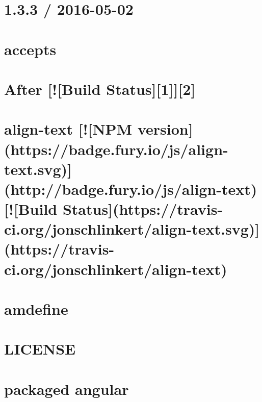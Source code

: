 \documentclass[twoside]{book}
\newcommand{\+}{\discretionary{\mbox{\scriptsize$\hookleftarrow$}}{}{}}
\begin{document}
\chapter{1.3.3 / 2016-\/05-\/02}
\label{md_app_web_node_modules_accepts__h_i_s_t_o_r_y}

\chapter{accepts}
\label{md_app_web_node_modules_accepts__r_e_a_d_m_e}

\chapter{After \mbox{[}!\mbox{[}Build Status\mbox{]}\mbox{[}1\mbox{]}\mbox{]}\mbox{[}2\mbox{]}}
\label{md_app_web_node_modules_after__r_e_a_d_m_e}

\chapter{align-\/text \mbox{[}!\mbox{[}N\+PM version\mbox{]}(https\+://badge.fury.\+io/js/align-\/text.svg)\mbox{]}(http\+://badge.fury.\+io/js/align-\/text) \mbox{[}!\mbox{[}Build Status\mbox{]}(https\+://travis-\/ci.org/jonschlinkert/align-\/text.svg)\mbox{]}(https\+://travis-\/ci.org/jonschlinkert/align-\/text)}
\label{md_app_web_node_modules_align-text__r_e_a_d_m_e}

\chapter{amdefine}
\label{md_app_web_node_modules_amdefine__r_e_a_d_m_e}

\chapter{L\+I\+C\+E\+N\+SE}
\label{md_app_web_node_modules_angular__l_i_c_e_n_s_e}

\chapter{packaged angular}
\label{md_app_web_node_modules_angular__r_e_a_d_m_e}

\end{document}
